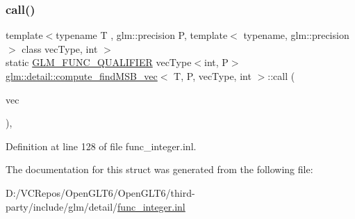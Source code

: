 \subsubsection{\texorpdfstring{call()}{call()}}
{\footnotesize\ttfamily template$<$typename T , glm\+::precision P, template$<$ typename, glm\+::precision $>$ class vec\+Type, int $>$ \\
static \mbox{\hyperlink{setup_8hpp_a33fdea6f91c5f834105f7415e2a64407}{G\+L\+M\+\_\+\+F\+U\+N\+C\+\_\+\+Q\+U\+A\+L\+I\+F\+I\+ER}} vec\+Type$<$int, P$>$ \mbox{\hyperlink{structglm_1_1detail_1_1compute__find_m_s_b__vec}{glm\+::detail\+::compute\+\_\+find\+M\+S\+B\+\_\+vec}}$<$ T, P, vec\+Type, int $>$\+::call (\begin{DoxyParamCaption}\item[{vec\+Type$<$ T, P $>$ const \&}]{vec }\end{DoxyParamCaption})\hspace{0.3cm}{\ttfamily [inline]}, {\ttfamily [static]}}



Definition at line 128 of file func\+\_\+integer.\+inl.



The documentation for this struct was generated from the following file\+:\begin{DoxyCompactItemize}
\item 
D\+:/\+V\+C\+Repos/\+Open\+G\+L\+T6/\+Open\+G\+L\+T6/third-\/party/include/glm/detail/\mbox{\hyperlink{func__integer_8inl}{func\+\_\+integer.\+inl}}\end{DoxyCompactItemize}
